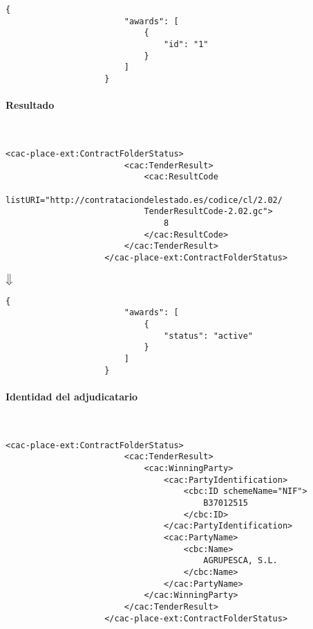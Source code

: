                 \begin{lstlisting}[language=lJSON]
                    {
                        "awards": [
                            {
                                "id": "1"
                            }
                        ]
                    }
                \end{lstlisting}
                
            \paragraph{Resultado} \mbox{}\\
                \begin{lstlisting}[language=lXML]
                    <cac-place-ext:ContractFolderStatus>
                        <cac:TenderResult>
                            <cac:ResultCode
                            listURI="http://contrataciondelestado.es/codice/cl/2.02/
                            TenderResultCode-2.02.gc">
                                8
                            </cac:ResultCode>
                        </cac:TenderResult>
                    </cac-place-ext:ContractFolderStatus>
                \end{lstlisting}
                
                \begin{center}
                    $\big\Downarrow$
                \end{center}
                
                \begin{lstlisting}[language=lJSON]
                    {
                        "awards": [
                            {
                                "status": "active"
                            }
                        ]
                    }
                \end{lstlisting}
            
            \paragraph{Identidad del adjudicatario} \mbox{}\\
                \begin{lstlisting}[language=lXML]
                    <cac-place-ext:ContractFolderStatus>
                        <cac:TenderResult>
                            <cac:WinningParty>
                                <cac:PartyIdentification>
                                    <cbc:ID schemeName="NIF">
                                        B37012515
                                    </cbc:ID>
                                </cac:PartyIdentification>
                                <cac:PartyName>
                                    <cbc:Name>
                                        AGRUPESCA, S.L.
                                    </cbc:Name>
                                </cac:PartyName>
                            </cac:WinningParty>
                        </cac:TenderResult>
                    </cac-place-ext:ContractFolderStatus>
                \end{lstlisting}
                
